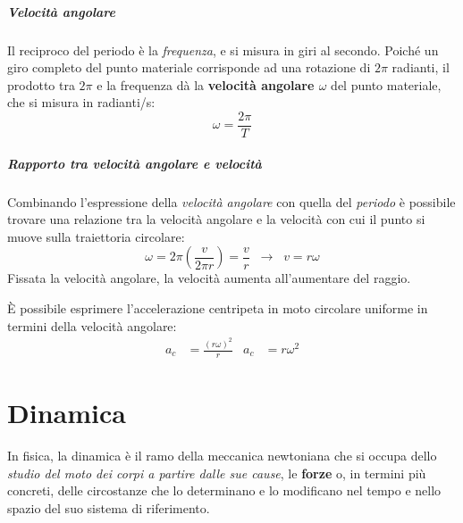 \documentclass[12pt,oneside]{book}
\begin{document}
\paragraph{Velocità angolare}
Il reciproco del periodo è la \emph{frequenza}, e si misura in giri al secondo. Poiché un giro completo del punto materiale corrisponde ad una rotazione di $2\pi$ radianti,
il prodotto tra $2\pi$ e la frequenza dà la \textbf{velocità angolare $\omega$} del punto materiale, che si misura in radianti/s:
\begin{equation*}
    \omega = \frac{2\pi}{T}
\end{equation*}

\paragraph{Rapporto tra velocità angolare e velocità}
Combinando l'espressione della \emph{velocità angolare} con quella del \emph{periodo} è possibile trovare una relazione tra la velocità angolare e la velocità con cui il 
punto si muove sulla traiettoria circolare:
\begin{equation*}
    \omega = 2\pi \left (\frac{v}{2\pi r} \right)  = \frac{v}{r} \;\; \rightarrow \;\; v = r\omega
\end{equation*}
Fissata la velocità angolare, la velocità aumenta all'aumentare del raggio.

È possibile esprimere l'accelerazione centripeta in moto circolare uniforme in termini della velocità angolare:
\begin{align*}
    a_c &= \frac{(r\omega)^2}{r} & a_c &= r\omega^2
\end{align*}


\chapter{Dinamica}
In fisica, la dinamica è il ramo della meccanica newtoniana che si occupa dello \emph{studio del moto dei corpi a partire dalle sue cause}, le \textbf{forze}
o, in termini più concreti, delle circostanze che lo determinano e lo modificano nel tempo e nello spazio del suo sistema di riferimento.
\end{document}
